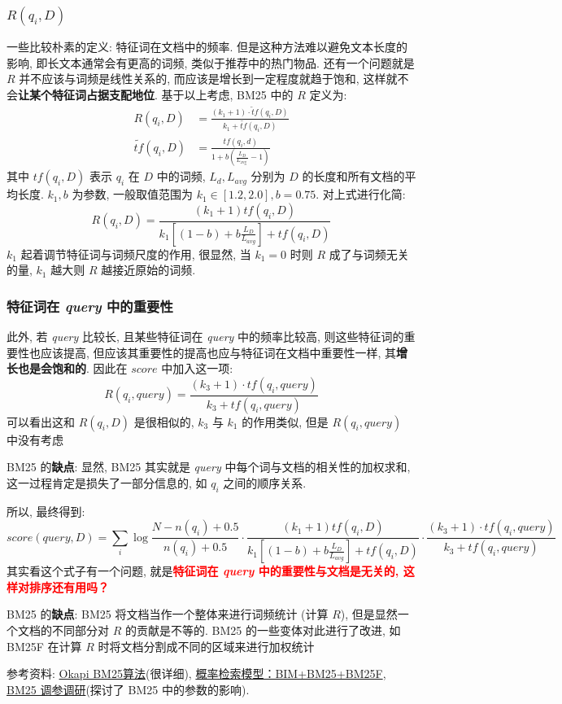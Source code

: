 \subsubsection{$R(q_i, D)$}
一些比较朴素的定义: 特征词在文档中的频率. 但是这种方法难以避免文本长度的影响, 即长文本通常会有更高的词频, 类似于推荐中的热门物品. 还有一个问题就是 $R$ 并不应该与词频是线性关系的, 而应该是增长到一定程度就趋于饱和, 这样就不会\textbf{让某个特征词占据支配地位}. 基于以上考虑, BM25 中的 $R$ 定义为:
$$
\begin{aligned}
	R\left(q_{i}, D\right) &=\frac{\left(k_{1}+1\right) \cdot \tilde{t} f\left(q_{i}, D\right)}{k_{1}+\tilde{tf}\left(q_{i}, D\right)} \\
	\tilde{t f}\left(q_{i}, D\right) &=\frac{t f\left(q_{i}, d\right)}{1+b\left(\frac{L_{D}}{L_{\text {avg }}}-1\right)}
\end{aligned}
$$
其中 $tf(q_i, D)$ 表示 $q_i$ 在 $D$ 中的词频, $L_d, L_{avg}$ 分别为 $D$ 的长度和所有文档的平均长度. $k_1, b$ 为参数, 一般取值范围为 $k_1 \in [1.2, 2.0], b=0.75$. 对上式进行化简:
$$
R(q_i, D) = \frac{(k_1+1) tf(q_i, D)}{k_1[(1 - b) + b \frac{L_D}{L_{avg}}] + tf(q_i, D)}
$$
$k_1$ 起着调节特征词与词频尺度的作用, 很显然, 当 $k_1=0$ 时则 $R$ 成了与词频无关的量, $k_1$ 越大则 $R$ 越接近原始的词频.

\subsubsection{特征词在 \textit{query} 中的重要性}
此外, 若 \textit{query} 比较长, 且某些特征词在 \textit{query} 中的频率比较高, 则这些特征词的重要性也应该提高, 但应该其重要性的提高也应与特征词在文档中重要性一样, 其\textbf{增长也是会饱和的}. 因此在 $score$ 中加入这一项:
$$
R(q_i, query) = \frac{(k_3 + 1) \cdot tf(q_i, query)}{k_3 + tf(q_i, query)}
$$
可以看出这和 $R(q_i, D)$ 是很相似的, $k_3$ 与 $k_1$ 的作用类似, 但是 $R(q_i, query)$ 中没有考虑

BM25 的\textbf{缺点}: 显然, BM25 其实就是 \textit{query} 中每个词与文档的相关性的加权求和, 这一过程肯定是损失了一部分信息的, 如 $q_i$ 之间的顺序关系. 

所以, 最终得到:
$$
score(query, D) = \sum_{i} \log \frac{N-n\left(q_{i}\right)+0.5}{n\left(q_{i}\right)+0.5} \cdot \frac{(k_1+1) tf(q_i, D)}{k_1[(1 - b) + b \frac{L_D}{L_{avg}}] + tf(q_i, D)} \cdot \frac{(k_3 + 1) \cdot tf(q_i, query)}{k_3 + tf(q_i, query)}
$$
其实看这个式子有一个问题, 就是\textbf{\textcolor{red}{特征词在 \textit{query} 中的重要性与文档是无关的, 这样对排序还有用吗？}}

BM25 的\textbf{缺点}: BM25 将文档当作一个整体来进行词频统计 (计算 $R$), 但是显然一个文档的不同部分对 $R$ 的贡献是不等的. BM25 的一些变体对此进行了改进, 如 BM25F 在计算 $R$ 时将文档分割成不同的区域来进行加权统计

参考资料: \href{https://www.cnblogs.com/geeks-reign/p/Okapi_BM25.html}{Okapi BM25算法}(很详细), \href{https://www.cnblogs.com/bentuwuying/p/6730891.html}{概率检索模型：BIM+BM25+BM25F}, \href{https://www.cnblogs.com/NaughtyBaby/p/9774836.html}{BM25 调参调研}(探讨了 BM25 中的参数的影响).